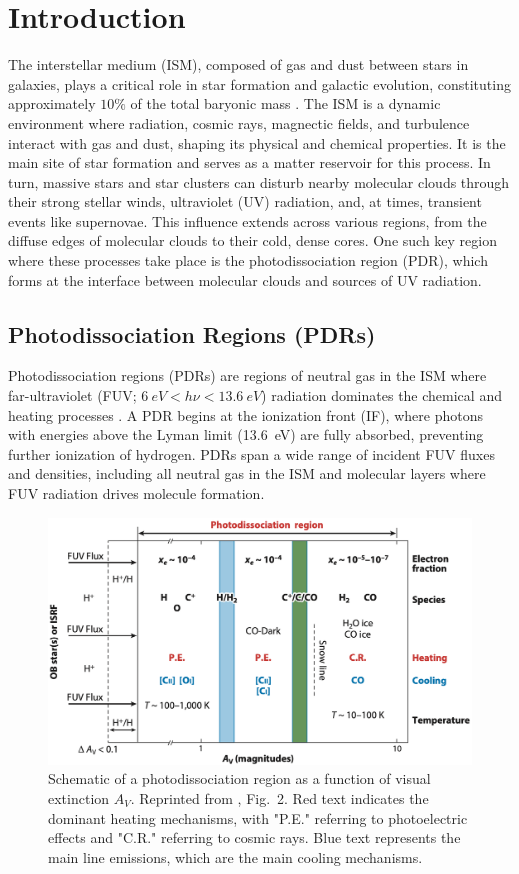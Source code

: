\documentclass[12pt,a4paper]{article}
\begin{document}
\clearpage
{}
\section{Introduction}

The interstellar medium (ISM), composed of gas and dust between stars in galaxies, plays a critical role in star formation and galactic evolution, constituting approximately $10\%$ of the total baryonic mass \parencite{Draine2011}. The ISM is a dynamic environment where radiation, cosmic rays, magnectic fields, and turbulence interact with gas and dust, shaping its physical and chemical properties. It is the main site of star formation and serves as a matter reservoir for this process. In turn, massive stars and star clusters can disturb nearby molecular clouds through their strong stellar winds, ultraviolet (UV) radiation, and, at times, transient events like supernovae. This influence extends across various regions, from the diffuse edges of molecular clouds to their cold, dense cores. One such key region where these processes take place is the photodissociation region (PDR), which forms at the interface between molecular clouds and sources of UV radiation. 

\subsection{Photodissociation Regions (PDRs)}
Photodissociation regions (PDRs) are regions of neutral gas in the ISM where far-ultraviolet (FUV; $\qty{6}{eV} < h\nu < \qty{13.6}{eV}$) radiation dominates the chemical and heating processes \parencite{Tielens1985}. A PDR begins at the ionization front (IF), where photons with energies above the Lyman limit (\qty{13.6}{eV}) are fully absorbed, preventing further ionization of hydrogen. PDRs span a wide range of incident FUV fluxes and densities, including all neutral gas in the ISM and molecular layers where FUV radiation drives molecule formation.

\begin{figure}[hb]
    \centering
    \includegraphics[width=.7\textwidth,keepaspectratio]{figures/PDRScheme.png}
    \caption{Schematic of a photodissociation region as a function of visual extinction $A_V$. Reprinted from \textcite{Wolfire2022}, Fig.~2. Red text indicates the dominant heating mechanisms, with "P.E." referring to photoelectric effects and "C.R." referring to cosmic rays. Blue text represents the main line emissions, which are the main cooling mechanisms.} \label{fig:pdrscheme}
\end{figure}
\end{document}
